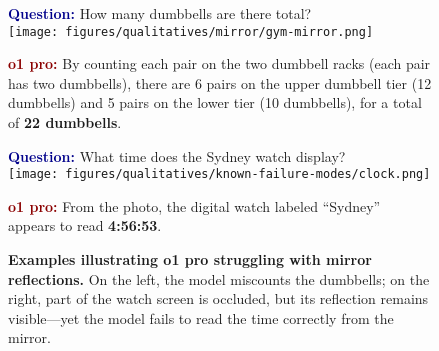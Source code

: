 \begin{figure}[ht!]
\begin{minipage}{0.49\textwidth}
\begin{questionbox}[title=Counting real objects in front of a mirror]
\textbf{\textcolor{darkblue}{Question:}}  How many dumbbells are there total? \\
\vspace{2mm}
\texttt{[image: figures/qualitatives/mirror/gym-mirror.png]}
\vspace{2mm}

\textbf{\textcolor{darkred}{o1 pro:}} By counting each pair on the two dumbbell racks (each pair has two dumbbells), there are 6 pairs on the upper dumbbell tier (12 dumbbells) and 5 pairs on the lower tier (10 dumbbells), for a total of \textbf{22 dumbbells}.
\end{questionbox}
\end{minipage}
\hfill
\begin{minipage}{0.49\textwidth}
\begin{questionbox}[title=Reading through reflection]
\textbf{\textcolor{darkblue}{Question:}}  What time does the Sydney watch display? \\
\vspace{2mm}
\texttt{[image: figures/qualitatives/known-failure-modes/clock.png]}
\vspace{2mm}

\textbf{\textcolor{darkred}{o1 pro:}} From the photo, the digital watch labeled ``Sydney'' appears to read \textbf{4:56:53}.
\end{questionbox}
\end{minipage}
\caption{\textbf{Examples illustrating o1 pro struggling with mirror reflections.} On the left, the model miscounts the dumbbells; on the right, part of the watch screen is occluded, but its reflection remains visible—yet the model fails to read the time correctly from the mirror.}
\label{fig:two_boxes}
\end{figure}


